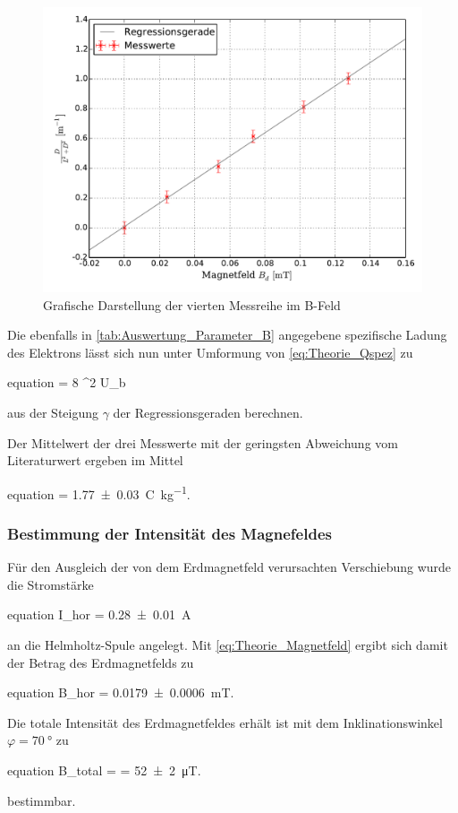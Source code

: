 		\begin{figure}[!h]
		\centering
			\includegraphics[scale=0.7]{Grafiken/BFeld_Messreihe_IV.pdf}
			\caption{Grafische Darstellung der vierten Messreihe im B-Feld}\label{fig:Auswertung_Messdaten_II_IV}
		\end{figure}

		Die ebenfalls in \cref{tab:Auswertung_Parameter_B} angegebene spezifische Ladung des Elektrons lässt sich nun unter Umformung von \cref{eq:Theorie_Qspez} zu 
		\begin{empheq}{equation} 
			 = 8 \cdot \gamma^{2} \cdot U_{b}  
		\end{empheq}	
		aus der Steigung $\gamma$ der Regressionsgeraden berechnen.
		
		Der Mittelwert der drei Messwerte mit der geringsten Abweichung vom Literaturwert
		ergeben im Mittel
		\begin{empheq}{equation}
			\label{eq:Auswertung_Qspez} 
			 = \SI{1.77(3)}{\coulomb\per\kg}.
		\end{empheq}
\newpage		
	\subsubsection{Bestimmung der Intensität des Magnefeldes}
	
		Für den Ausgleich der von dem Erdmagnetfeld verursachten Verschiebung wurde die Stromstärke
 		\begin{empheq}{equation}
 			I_{hor} = \SI{0.28(1)}{\ampere}
 		\end{empheq}
		an die Helmholtz-Spule angelegt. Mit \cref{eq:Theorie_Magnetfeld} 
		ergibt sich damit der Betrag des Erdmagnetfelds zu 
 		\begin{empheq}{equation}
 			B_{hor} = \SI{0.0179(6)}{\milli\tesla}.
 		\end{empheq}
 		
 		Die totale Intensität des Erdmagnetfeldes erhält ist mit dem Inklinationswinkel 
 		$\varphi = \SI{70}{\degree}$ zu
 		\begin{empheq}{equation}
 			\label{eq:Auswertung_Btotal}
 			B_{total} =  = \SI{52(2)}{\micro\tesla}.
 		\end{empheq}
 		bestimmbar.
